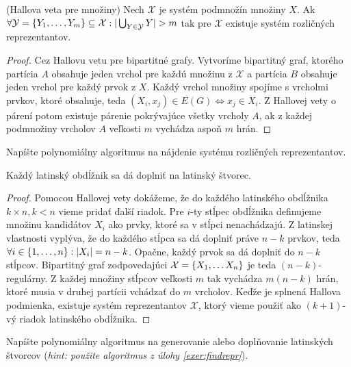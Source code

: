 \begin{theorem}{(Hallova veta pre množiny)}
    Nech $\mathcal{X}$ je systém podmnožín množiny $X$. 
    Ak $\forall \mathcal{Y} = \left\{Y_1, \ldots, Y_m\right\} \subseteq \mathcal{X}: |\bigcup_{Y \in \mathcal{Y}} Y| > m$ tak pre 
    $\mathcal{X}$ existuje systém rozličných reprezentantov.
\end{theorem}
\begin{proof}
Cez Hallovu vetu pre bipartitné grafy. 
Vytvoríme bipartitný graf, ktorého partícia $A$ obsahuje jeden vrchol pre každú množinu 
z $\mathcal{X}$ a partícia $B$ obsahuje jeden vrchol pre každý prvok z $X$. Každý vrchol množiny spojíme s vrcholmi prvkov, 
ktoré obsahuje, teda $(X_i, x_j) \in E(G) \Leftrightarrow x_j \in X_i$. 
Z Hallovej vety o párení potom existuje párenie pokrývajúce všetky vrcholy $A$,
ak z každej podmnožiny vrcholov $A$ veľkosti $m$ vychádza aspoň $m$ hrán.  
\end{proof}

\begin{exercise}
\label{exer:findrepr}
Napíšte polynomiálny algoritmus na nájdenie systému rozličných reprezentantov.
\end{exercise}

\begin{theorem}
    Každý latinský obdĺžnik sa dá doplniť na latinský štvorec.
\end{theorem}
\begin{proof}
    Pomocou Hallovej vety dokážeme, že do každého latinského obdĺžnika $k \times n, k < n$ vieme pridať ďalší riadok.
    Pre $i$-ty stĺpec obdĺžnika definujeme množinu kandidátov $X_i$ ako prvky, ktoré sa v stĺpci nenachádzajú.
    Z latinskej vlastnosti vyplýva, že do každého stĺpca sa dá doplniť práve $n-k$ prvkov, 
    teda $\forall i \in \left\{1, \ldots, n\right\}: |X_i| = n-k$. Opačne, každý prvok sa dá doplniť do $n-k$ stĺpcov. 
    Bipartitný graf zodpovedajúci $\mathcal{X} = \left\{X_1, \ldots X_n\right\}$ je teda $(n-k)$-regulárny. 
    Z každej množiny stĺpcov veľkosti $m$ tak vychádza $m(n-k)$ hrán, ktoré musia v druhej partícii vchádzať do $m$ vrcholov. 
    Keďže je splnená Hallova podmienka, existuje systém reprezentantov $\mathcal{X}$, ktorý vieme použiť ako $(k+1)$-vý riadok
    latinského obdĺžnika.
\end{proof}

\begin{exercise}
Napíšte polynomiálny algoritmus na generovanie alebo doplňovanie latinských štvorcov (\emph{hint: použite algoritmus z úlohy \ref{exer:findrepr}}).
\end{exercise}

